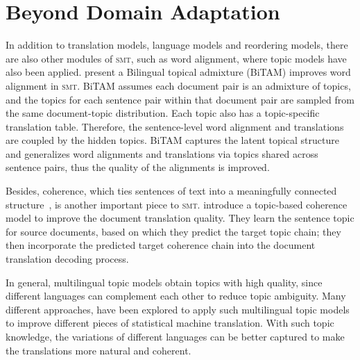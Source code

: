 \section{Beyond Domain Adaptation}

In addition to translation models, language models and reordering models,
there are also other modules of \textsc{smt}, such as word alignment,
where topic models have also been applied.  present a
Bilingual topical admixture (BiTAM) \citet{zhao-06}  improves  word
alignment in \textsc{smt}. BiTAM assumes each document pair is an
admixture of topics, and the topics for each sentence pair within that
document pair are sampled from the same document-topic
distribution. Each topic also has a topic-specific translation
table. Therefore, the sentence-level word alignment and translations
are coupled by the hidden topics.  BiTAM captures the latent
topical structure and generalizes word alignments and translations via
topics shared across sentence pairs, thus the quality of the
alignments is improved.

Besides, coherence, which ties sentences of text into a meaningfully
connected structure~\citep{xiong-13}, is another important piece to
\textsc{smt}.\citet{xiong-13} introduce a topic-based coherence model
to improve the document translation quality. They learn the sentence
topic for source documents, based on which they predict the target
topic chain; they then incorporate the predicted target coherence
chain into the document translation decoding process.


In general, multilingual topic models obtain topics with high quality,
since different languages can complement each other to reduce topic
ambiguity. Many different approaches, have been explored to apply such
multilingual topic models to improve different pieces of statistical
machine translation. With such topic knowledge, the variations of
different languages can be better captured to make the translations
more natural and coherent.


